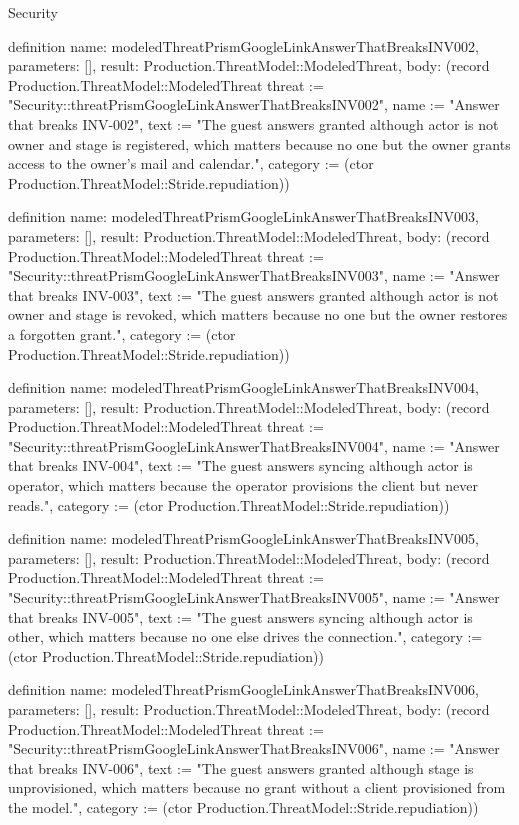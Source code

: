 \begin{lexlean}{Security}
\begin{semanticmodule}
definition{
  name: modeledThreatPrismGoogleLinkAnswerThatBreaksINV002,
  parameters: [],
  result: Production.ThreatModel::ModeledThreat,
  body: (record Production.ThreatModel::ModeledThreat {threat := "Security::threatPrismGoogleLinkAnswerThatBreaksINV002", name := "Answer that breaks INV-002", text := "The guest answers granted although actor is not owner and stage is registered, which matters because no one but the owner grants access to the owner's mail and calendar.", category := (ctor Production.ThreatModel::Stride.repudiation)})
}

definition{
  name: modeledThreatPrismGoogleLinkAnswerThatBreaksINV003,
  parameters: [],
  result: Production.ThreatModel::ModeledThreat,
  body: (record Production.ThreatModel::ModeledThreat {threat := "Security::threatPrismGoogleLinkAnswerThatBreaksINV003", name := "Answer that breaks INV-003", text := "The guest answers granted although actor is not owner and stage is revoked, which matters because no one but the owner restores a forgotten grant.", category := (ctor Production.ThreatModel::Stride.repudiation)})
}

definition{
  name: modeledThreatPrismGoogleLinkAnswerThatBreaksINV004,
  parameters: [],
  result: Production.ThreatModel::ModeledThreat,
  body: (record Production.ThreatModel::ModeledThreat {threat := "Security::threatPrismGoogleLinkAnswerThatBreaksINV004", name := "Answer that breaks INV-004", text := "The guest answers syncing although actor is operator, which matters because the operator provisions the client but never reads.", category := (ctor Production.ThreatModel::Stride.repudiation)})
}

definition{
  name: modeledThreatPrismGoogleLinkAnswerThatBreaksINV005,
  parameters: [],
  result: Production.ThreatModel::ModeledThreat,
  body: (record Production.ThreatModel::ModeledThreat {threat := "Security::threatPrismGoogleLinkAnswerThatBreaksINV005", name := "Answer that breaks INV-005", text := "The guest answers syncing although actor is other, which matters because no one else drives the connection.", category := (ctor Production.ThreatModel::Stride.repudiation)})
}

definition{
  name: modeledThreatPrismGoogleLinkAnswerThatBreaksINV006,
  parameters: [],
  result: Production.ThreatModel::ModeledThreat,
  body: (record Production.ThreatModel::ModeledThreat {threat := "Security::threatPrismGoogleLinkAnswerThatBreaksINV006", name := "Answer that breaks INV-006", text := "The guest answers granted although stage is unprovisioned, which matters because no grant without a client provisioned from the model.", category := (ctor Production.ThreatModel::Stride.repudiation)})
}


\end{semanticmodule}
\end{lexlean}
